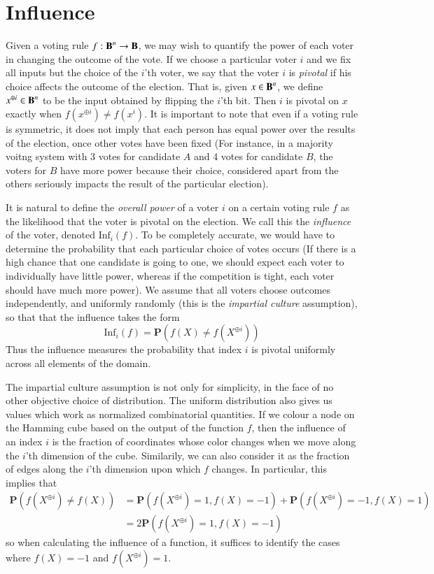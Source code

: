 \section{Influence}

Given a voting rule $f: \operatorname{\mathbf{B}}^n \to \operatorname{\mathbf{B}}$, we may wish to quantify the power of each voter in changing the outcome of the vote. If we choose a particular voter $i$ and we fix all inputs but the choice of the $i$'th voter, we say that the voter $i$ is \emph{pivotal} if his choice affects the outcome of the election. That is, given $x \in \operatorname{\mathbf{B}}^n$, we define $x^{\oplus i} \in \operatorname{\mathbf{B}}^n$ to be the input obtained by flipping the $i$'th bit. Then $i$ is pivotal on $x$ exactly when $f(x^{\oplus i}) \neq f(x^i)$. It is important to note that even if a voting rule is symmetric, it does not imply that each person has equal power over the results of the election, once other votes have been fixed (For instance, in a majority voitng system with 3 votes for candidate $A$ and 4 votes for candidate $B$, the voters for $B$ have more power because their choice, considered apart from the others seriously impacts the result of the particular election).

It is natural to define the {\it overall power} of a voter $i$ on a certain voting rule $f$ as the likelihood that the voter is pivotal on the election. We call this the \emph{influence} of the voter, denoted $\text{Inf}_i(f)$. To be completely accurate, we would have to determine the probability that each particular choice of votes occurs (If there is a high chance that one candidate is going to one, we should expect each voter to individually have little power, whereas if the competition is tight, each voter should have much more power). We assume that all voters choose outcomes independently, and uniformly randomly (this is the \emph{impartial culture} assumption), so that that the influence takes the form
%
\[ \text{Inf}_i(f) = \mathbf{P}(f(X) \neq f(X^{\oplus i})) \]
%
Thus the influence measures the probability that index $i$ is pivotal uniformly across all elements of the domain.

The impartial culture assumption is not only for simplicity, in the face of no other objective choice of distribution. The uniform distribution also gives us values which work as normalized combinatorial quantities. If we colour a node on the Hamming cube based on the output of the function $f$, then the influence of an index $i$ is the fraction of coordinates whose color changes when we move along the $i$'th dimension of the cube. Similarily, we can also consider it as the fraction of edges along the $i$'th dimension upon which $f$ changes. In particular, this implies that
%
\begin{align*}
    \mathbf{P}(f(X^{\oplus i}) \neq f(X)) &= \mathbf{P}(f(X^{\oplus i}) = 1, f(X) = -1) + \mathbf{P}(f(X^{\oplus i}) = -1, f(X) = 1)\\
    &= 2 \mathbf{P}(f(X^{\oplus i}) = 1, f(X) = -1)
\end{align*}
%
so when calculating the influence of a function, it suffices to identify the cases where $f(X) = -1$ and $f(X^{\oplus i}) = 1$.

